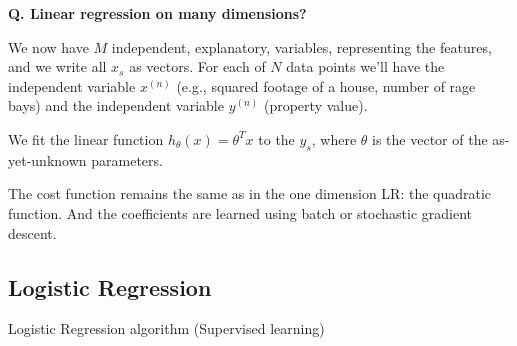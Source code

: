\begin{frame}[fragile]{\textbf{Q. Linear regression on many dimensions?}}
  \begin{wideitemize}
    \item We now have $M$ independent, explanatory, variables, representing the
      features, and we write all $x_s$ as vectors. For each of $N$ data points
      we'll have the independent variable $x^{(n)}$ (e.g., squared footage of a
      house, number of rage bays) and the independent variable $y^{(n)}$
      (property value).
    \item We fit the linear function $h_{\theta}(x) = \theta^{T}x$ to the $y_s$,
      where $\theta$ is the vector of the as-yet-unknown parameters.
    \item The cost function remains the same as in the one dimension LR: the
      quadratic function. And the coefficients are learned using batch or
      stochastic gradient descent.
  \end{wideitemize}
\end{frame}



\subsection{Logistic Regression}
\begin{transitionsubframe}
  \begin{center}
    \Huge Logistic Regression algorithm (Supervised learning)
  \end{center}
\end{transitionsubframe}


